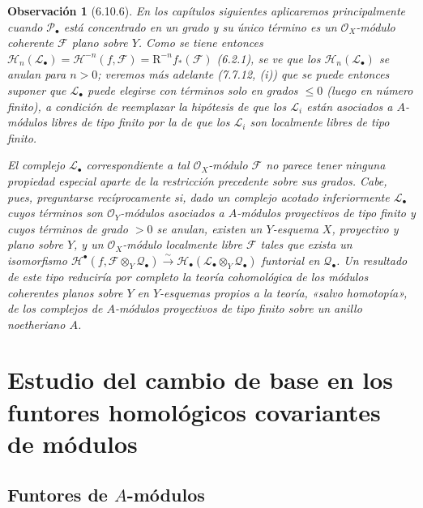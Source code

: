 \documentclass[10pt,oneside,openany]{book}
\theoremstyle{egaenv}\newtheorem*{env}{---}
\theoremstyle{egastatement}
\theoremstyle{egadescription}
\newtheorem*{remark}{Observación}
\newcommand{\oldpage}[2][]{\marginnote{\normalfont\scriptsize\textbf{#1}\,|\,#2}\ignorespaces}
\begin{document}
\begin{remark}[6.10.6]
\label{III.6.10.6}
En los capítulos siguientes aplicaremos 
principalmente cuando $\mathscr P_\bullet$ está concentrado en un grado
y su único término es un $\mathscr O_X$-módulo coherente $\mathscr F$ plano
sobre $Y$. Como se tiene entonces
$\mathscr H_n(\mathscr L_\bullet)=\mathscr H^{-n}(f,\mathscr F)=\mathrm R^{-n}f_*(\mathscr F)$ (6.2.1),
se ve que los $\mathscr H_n(\mathscr L_\bullet)$ se anulan para $n>0$; veremos más adelante (7.7.12, (i)) que se puede entonces suponer que $\mathscr L_\bullet$ puede
elegirse \emph{con términos solo en grados} $\leqslant0$ (luego en
número \emph{finito}), a condición de reemplazar la hipótesis de que los $\mathscr L_i$
están asociados a $A$-módulos libres de tipo finito por la de que los
$\mathscr L_i$ son \emph{localmente libres} de tipo finito.

El complejo $\mathscr L_\bullet$ correspondiente a tal
$\mathscr O_X$-módulo $\mathscr F$ no parece tener ninguna propiedad
especial
\oldpage[III]{175}
aparte de la restricción precedente sobre sus grados. Cabe, pues,
preguntarse recíprocamente si, dado un complejo acotado
inferiormente $\mathscr L_\bullet$ cuyos términos son
$\mathscr O_Y$-módulos asociados a $A$-módulos proyectivos de tipo
finito y cuyos términos de grado $>0$ se anulan, existen un
$Y$-esquema $X$, proyectivo y plano sobre $Y$, y un
$\mathscr O_X$-módulo localmente libre $\mathscr F$ tales que exista un
isomorfismo
$\mathscr H^\bullet(f,\mathscr F\otimes_Y\mathscr Q_\bullet)\xrightarrow{\sim}\mathscr H_\bullet(\mathscr L_\bullet\otimes_Y\mathscr Q_\bullet)$
funtorial en $\mathscr Q_\bullet$. Un resultado de este tipo reduciría
por completo la teoría cohomológica de los módulos coherentes
planos sobre $Y$ en $Y$-esquemas propios a la teoría, «salvo
homotopía», de los complejos de $A$-módulos proyectivos de tipo
finito sobre un anillo noetheriano $A$.
\end{remark}

\section{Estudio del cambio de base en los funtores homológicos covariantes de módulos}
\label{section:III.7}
\label{section:III.7.fr}

\subsection{Funtores de $A$-módulos}
\label{subsection:III.7.1}
\label{subsection:III.7.1.fr}
\end{document}
